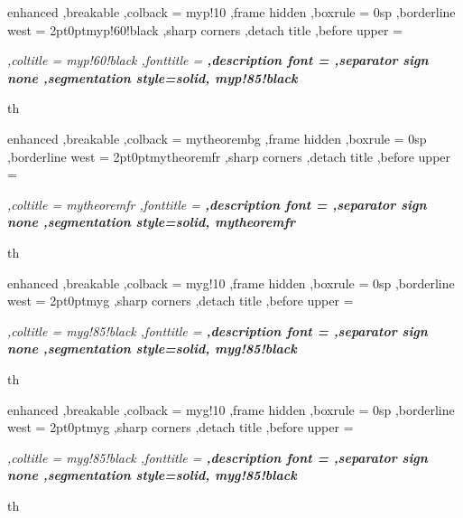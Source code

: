 {%
	enhanced
	,breakable
	,colback = myp!10
	,frame hidden
	,boxrule = 0sp
	,borderline west = {2pt}{0pt}{myp!60!black}
	,sharp corners
	,detach title
	,before upper = \tcbtitle\par\smallskip\noindent\itshape\setlength{\parindent}{1.5em}
	,coltitle = myp!60!black
	,fonttitle = \bfseries\sffamily
	,description font = \mdseries
	,separator sign none
	,segmentation style={solid, myp!85!black}
}
{th}
{%
	enhanced
	,breakable
	,colback = mytheorembg
	,frame hidden
	,boxrule = 0sp
	,borderline west = {2pt}{0pt}{mytheoremfr}
	,sharp corners
	,detach title
	,before upper = \tcbtitle\par\smallskip\noindent\itshape\setlength{\parindent}{1.5em}
	,coltitle = mytheoremfr
	,fonttitle = \bfseries\sffamily
	,description font = \mdseries
	,separator sign none
	,segmentation style={solid, mytheoremfr}
}
{th}


{%
	enhanced
	,breakable
	,colback = myg!10
	,frame hidden
	,boxrule = 0sp
	,borderline west = {2pt}{0pt}{myg}
	,sharp corners
	,detach title
	,before upper = \tcbtitle\par\smallskip\noindent\itshape\setlength{\parindent}{1.5em}
	,coltitle = myg!85!black
	,fonttitle = \bfseries\sffamily
	,description font = \mdseries
	,separator sign none
	,segmentation style={solid, myg!85!black}
}
{th}

{%
	enhanced
	,breakable
	,colback = myg!10
	,frame hidden
	,boxrule = 0sp
	,borderline west = {2pt}{0pt}{myg}
	,sharp corners
	,detach title
	,before upper = \tcbtitle\par\smallskip\noindent\itshape\setlength{\parindent}{1.5em}
	,coltitle = myg!85!black
	,fonttitle = \bfseries\sffamily
	,description font = \mdseries
	,separator sign none
	,segmentation style={solid, myg!85!black}
}
{th}


